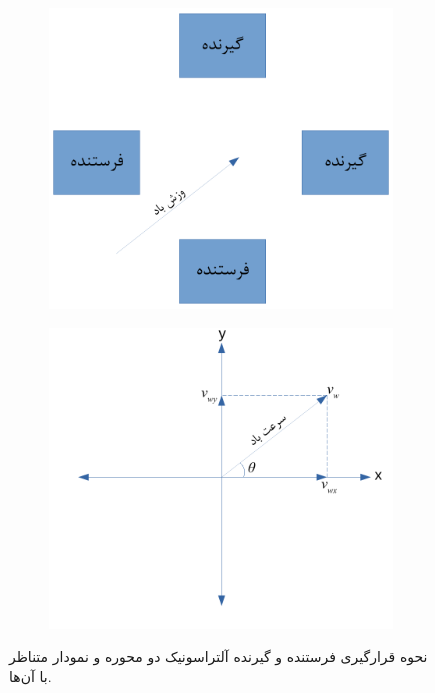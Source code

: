 \begin{figure}[!h]
	\begin{subfigure}[b]{0.5\textwidth}
		\includegraphics[width=\linewidth]{Assets/ultrasonic 2d.pdf}
		\caption{}
		\label{fig:2dUltrasonic}
	\end{subfigure}
	\begin{subfigure}[b]{0.5\textwidth}
		\includegraphics[width=\linewidth]{Assets/ultrasonic 2d axis.pdf}
		\caption{}
		\label{fig:2dUltrasonicAxis}
	\end{subfigure}
	\caption{نحوه قرارگیری فرستنده و گیرنده آلتراسونیک دو محوره و نمودار متناظر با آن‌ها.}
\end{figure}

